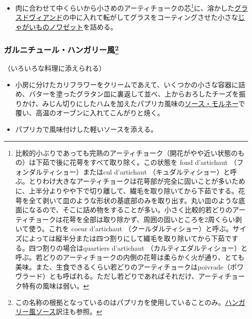\begin{recette}
\begin{itemize}
\tightlist
\item
  肉に合わせて中くらいから小さめのアーティチョークの芯\footnote{比較的小ぶりであっても完熟のアーティチョーク（開花がやや近い状態のもの）は下茹で後に花萼をすべて取り除く。この状態を
    fond d'artichaut （フォンダルティショー）またはcul d'artichaut
    （キュダルティショー）と呼ぶ。とりわけ大きなアーティチョークは花萼部が完全に固いことが多いために、上半分よりやや下で切り離して、繊毛を取り除いてから下茹でする。花萼を全て剥いて皿のような形状の基底部のみを取り出す。丸い皿のような底面になるので、そこに詰め物をすることが多い。小さく比較的若どりのアーティチョークは花萼を全部は取り除かず、周囲の固いところを2周くらい剥いて使う。これを
    coeur d'artichaut
    （クールダルティショー）と呼ぶ。サイズによっては縦半分または四つ割りにして繊毛を取り除いてから下茹でする。四つ割りの場合はquartiers
    d'artichaut
    （カルティエダルティショー）と呼ぶ。若どりのアーティチョークの内側の花萼は柔らかく火が通り、とても美味。また、生食できるくらい若どりのアーティチョークはpoivrade（ポワヴラード）とも呼ばれる。ただし若どりであればそれだけ、アーティチョーク特有の風味は弱い。}に、溶かした\protect\hyperlink{glace-de-viande}{グラスドヴィアンド}の中に入れて転がしてグラスをコーティングさせた小さな\protect\hyperlink{pommes-de-terre-noisette}{じゃがいものノワゼット}を詰める。
\end{itemize}

\hypertarget{garniture-a-la-hongroise}{%
\subsubsection[ガルニチュール・ハンガリー風]{\texorpdfstring{ガルニチュール・ハンガリー風\footnote{この名称の根拠となっているのはパプリカを使用していることのみ。\protect\hyperlink{sauce-hongroise}{ハンガリー風ソース}訳注も参照。}}{ガルニチュール・ハンガリー風}}\label{garniture-a-la-hongroise}}



（いろいろな料理に添えられる）

\begin{itemize}
\item
  小房に分けたカリフラワーをクリームであえて、いくつかの小さな容器に詰め、バターを塗ったグラタン皿に裏返して並べ、上からおろしたチーズを振りかけ、みじん切りにしたハムを加えたパプリカ風味の\protect\hyperlink{sauce-mornay}{ソース・モルネー}で覆い、高温のオーブンに入れてこんがりと焼く。
\item
  パプリカで風味付けした軽いソースを添える。
\end{itemize}


\end{recette}

